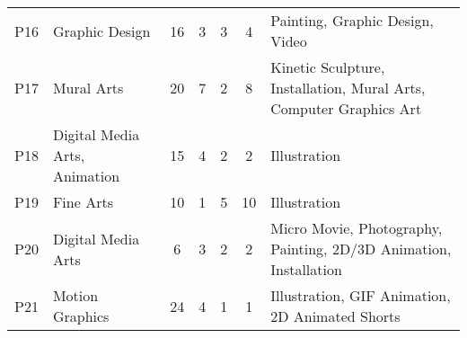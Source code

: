 \begin{table*}[t]
{\begin{tabular}{llccccl}
P16         & Graphic Design                     & 16                             & 3           & 3                          & 4              & Painting, Graphic Design, Video                                                         \\
P17         & Mural Arts                         & 20                             & 7           & 2                          & 8              & Kinetic Sculpture, Installation, Mural Arts, Computer Graphics Art                                     \\
P18         & Digital Media Arts, Animation      & 15                             & 4           & 2                          & 2              & Illustration                                                                            \\
P19         & Fine Arts                          & 10                             & 1           & 5                          & 10             & Illustration                                                                            \\
P20         & Digital Media Arts                 & 6                              & 3           & 2                          & 2              & Micro Movie, Photography, Painting, 2D/3D Animation, Installation                    \\
P21         & Motion Graphics                    & 24                             & 4           & 1                          & 1              & Illustration, GIF Animation, 2D Animated Shorts \\                               \bottomrule
\end{tabular}}
\end{table*}